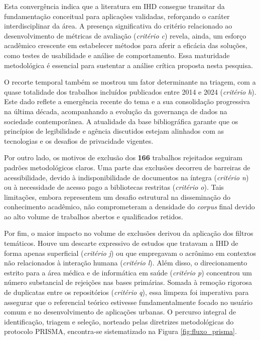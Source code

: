 \documentclass[
	12pt,				%
	oneside,			%
	a4paper,			%
	english,			%
	brazil				%
	]{abntex2ppgsi}
\begin{document}
Esta convergência indica que a literatura em IHD consegue transitar da fundamentação conceitual para aplicações validadas, reforçando o caráter interdisciplinar da área. A presença significativa do critério relacionado ao desenvolvimento de métricas de avaliação (\textit{critério c}) revela, ainda, um esforço acadêmico crescente em estabelecer métodos para aferir a eficácia das soluções, como testes de usabilidade e análise de comportamento. Essa maturidade metodológica é essencial para sustentar a análise crítica proposta nesta pesquisa.

O recorte temporal também se mostrou um fator determinante na triagem, com a quase totalidade dos trabalhos incluídos publicados entre 2014 e 2024 (\textit{critério h}). Este dado reflete a emergência recente do tema e a sua consolidação progressiva na última década, acompanhando a evolução da governança de dados na sociedade contemporânea. A atualidade da base bibliográfica garante que os princípios de legibilidade e agência discutidos estejam alinhados com as tecnologias e os desafios de privacidade vigentes.

Por outro lado, os motivos de exclusão dos \textbf{166} trabalhos rejeitados seguiram padrões metodológicos claros. Uma parte das exclusões decorreu de barreiras de acessibilidade, devido à indisponibilidade de documentos na íntegra (\textit{critério n}) ou à necessidade de acesso pago a bibliotecas restritas (\textit{critério o}). Tais limitações, embora representem um desafio estrutural na disseminação do conhecimento acadêmico, não comprometeram a densidade do \textit{corpus} final devido ao alto volume de trabalhos abertos e qualificados retidos.

Por fim, o maior impacto no volume de exclusões derivou da aplicação dos filtros temáticos. Houve um descarte expressivo de estudos que tratavam a IHD de forma apenas superficial (\textit{critério j}) ou que empregavam o acrônimo em contextos não relacionados à interação humana (\textit{critério l}). Além disso, o direcionamento estrito para a área médica e de informática em saúde (\textit{critério p}) concentrou um número substancial de rejeições nas bases primárias. Somada à remoção rigorosa de duplicatas entre os repositórios (\textit{critério q}), essa limpeza foi imperativa para assegurar que o referencial teórico estivesse fundamentalmente focado no usuário comum e no desenvolvimento de aplicações urbanas. O percurso integral de identificação, triagem e seleção, norteado pelas diretrizes metodológicas do protocolo PRISMA, encontra-se sistematizado na Figura \ref{fig:fluxo_prisma}.
\end{document}

